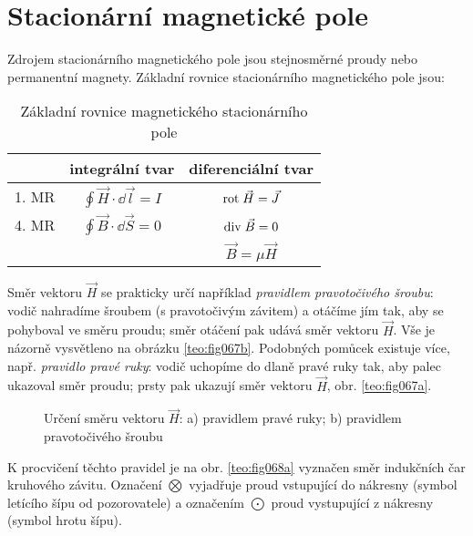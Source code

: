   \section{Stacionární magnetické pole}
    Zdrojem stacionárního magnetického pole jsou stejnosměrné proudy nebo permanentní magnety.
    Základní rovnice stacionárního magnetického pole jsou:

    \begin{table}[ht!]
      \centering
      \begin{tabular}{lc|c|}
        \cline{2-3}
        \multicolumn{1}{l|}{} & \textbf{integrální tvar} & \textbf{diferenciální tvar} \\
        \hline
        \multicolumn{1}{|l|}{1. MR} & $\oint\vec{H}\cdot \dd{\vec{l}} = I$ & $\mathrm{rot}\;\vec{H} = \vec{J}$ \\ 
        \cline{1-3}
        \hline
        \multicolumn{1}{|l|}{4. MR} & $\oint\vec{B}\cdot \dd{\vec{S}} = 0$ & $\mathrm{div}\;\vec{B} = 0$ \\
        \cline{1-3}
        & & $\vec{B} = \mu \vec{H}$ \\
        \cline{3-3}
      \end{tabular}
      \caption{Základní rovnice magnetického stacionárního pole}
    \end{table}

    Směr vektoru $\vec{H}$ se prakticky určí například \emph{pravidlem pravotočivého šroubu}: vodič
    nahradíme šroubem (s pravotočivým závitem) a otáčíme jím tak, aby se pohyboval ve směru proudu;
    směr otáčení pak udává směr vektoru $\vec{H}$. Vše je názorně vysvětleno na obrázku
    \ref{teo:fig067b}. Podobných pomůcek existuje více, např. \emph{pravidlo pravé ruky}: vodič
    uchopíme do dlaně pravé ruky tak, aby palec ukazoval směr proudu; prsty pak ukazují směr vektoru
    $\vec{H}$, obr. \ref{teo:fig067a}.

    \begin{figure}[ht!]
      \centering
      \hspace{1cm}
      \caption{Určení směru vektoru $\vec{H}$: a) pravidlem pravé ruky; b) pravidlem pravotočivého
              šroubu}
      \label{teo:fig067}
    \end{figure}
    K procvičení těchto pravidel je na obr. \ref{teo:fig068a} vyznačen směr indukčních čar
    kruhové\-ho závitu. Označení $\bigotimes$ vyjadřuje proud vstupující  do nákresny (symbol
    letícího šípu od pozorovatele) a označením $\bigodot$ proud vystupující z nákresny (symbol hrotu
    šípu).

